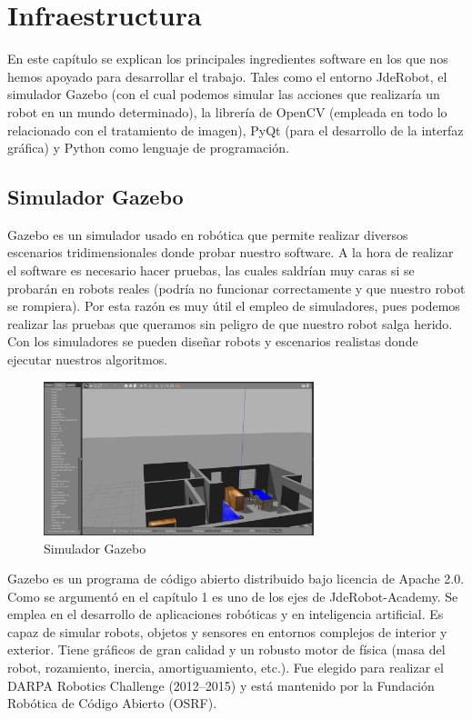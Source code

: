 \chapter{Infraestructura}\label{cap.infraestructura}
En este capítulo se explican los principales ingredientes software en los que nos hemos apoyado  para desarrollar el trabajo. Tales como el entorno JdeRobot, el simulador Gazebo (con el cual podemos simular las acciones que realizaría un robot en un mundo determinado), la librería de OpenCV (empleada en todo lo relacionado con el tratamiento de imagen), PyQt (para el desarrollo de la interfaz gráfica) y Python como lenguaje de programación.

\section{Simulador Gazebo}
Gazebo es un simulador usado en robótica que permite realizar diversos escenarios tridimensionales donde probar nuestro software. A la hora de realizar el software es necesario hacer pruebas, las cuales saldrían muy caras si se probarán en robots reales (podría no funcionar correctamente y que nuestro robot se rompiera). Por esta razón es muy útil el empleo de simuladores, pues podemos realizar las pruebas que queramos sin peligro de que nuestro robot salga herido. Con los simuladores se pueden diseñar robots y escenarios realistas donde ejecutar nuestros algoritmos.

\begin{figure}[H]
  \begin{center}
    \includegraphics[width=0.7\textwidth]{figures/Infraestructura/gazebo.png}
		\caption{Simulador Gazebo}
		\label{fig.gazebo}
		\end{center}
\end{figure}

Gazebo es un programa de código abierto distribuido bajo licencia de Apache 2.0. Como se argumentó en el capítulo 1 es uno de los ejes de JdeRobot-Academy.  Se emplea en el desarrollo de aplicaciones robóticas y en inteligencia artificial. Es capaz de simular robots, objetos y sensores en entornos complejos de interior y exterior. Tiene gráficos de gran calidad y un robusto motor de física (masa del robot, rozamiento, inercia, amortiguamiento, etc.). Fue elegido para realizar el DARPA Robotics Challenge (2012--2015) y está mantenido por la Fundación Robótica de Código Abierto (OSRF).\\

